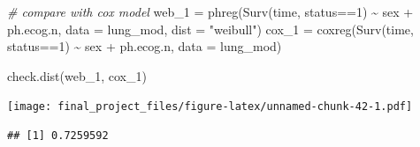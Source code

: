 \documentclass[
]{article}
\newenvironment{Shaded}{\begin{snugshade}}{\end{snugshade}}
\newcommand{\AttributeTok}[1]{\textcolor[rgb]{0.77,0.63,0.00}{#1}}
\newcommand{\CommentTok}[1]{\textcolor[rgb]{0.56,0.35,0.01}{\textit{#1}}}
\newcommand{\DecValTok}[1]{\textcolor[rgb]{0.00,0.00,0.81}{#1}}
\newcommand{\FunctionTok}[1]{\textcolor[rgb]{0.00,0.00,0.00}{#1}}
\newcommand{\NormalTok}[1]{#1}
\newcommand{\OtherTok}[1]{\textcolor[rgb]{0.56,0.35,0.01}{#1}}
\newcommand{\SpecialCharTok}[1]{\textcolor[rgb]{0.00,0.00,0.00}{#1}}
\newcommand{\StringTok}[1]{\textcolor[rgb]{0.31,0.60,0.02}{#1}}
\begin{document}
\begin{Shaded}
\begin{Highlighting}[]
\CommentTok{\# compare with cox model}
\NormalTok{web\_1 }\OtherTok{=} \FunctionTok{phreg}\NormalTok{(}\FunctionTok{Surv}\NormalTok{(time, status}\SpecialCharTok{==}\DecValTok{1}\NormalTok{) }\SpecialCharTok{\textasciitilde{}}\NormalTok{ sex }\SpecialCharTok{+}\NormalTok{ ph.ecog.n,}
                      \AttributeTok{data =}\NormalTok{ lung\_mod, }\AttributeTok{dist =} \StringTok{"weibull"}\NormalTok{)}
\NormalTok{cox\_1 }\OtherTok{=} \FunctionTok{coxreg}\NormalTok{(}\FunctionTok{Surv}\NormalTok{(time, status}\SpecialCharTok{==}\DecValTok{1}\NormalTok{) }\SpecialCharTok{\textasciitilde{}}\NormalTok{ sex }\SpecialCharTok{+}\NormalTok{ ph.ecog.n, }\AttributeTok{data =}\NormalTok{ lung\_mod)}

\FunctionTok{check.dist}\NormalTok{(web\_1, cox\_1)}
\end{Highlighting}
\end{Shaded}

\texttt{[image: final\_project\_files/figure-latex/unnamed-chunk-42-1.pdf]}

\begin{Shaded}
\end{Shaded}

\begin{verbatim}
## [1] 0.7259592
\end{verbatim}

\begin{Shaded}
\end{Shaded}
\end{document}

